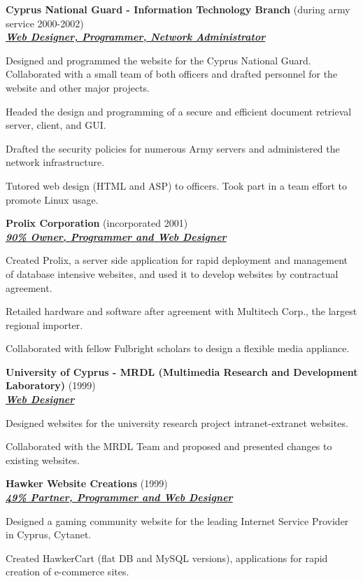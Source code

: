 \documentclass{article}
\newcommand{\employer}[3]{{ \textbf{#1} (#2)\\ \underline{\textbf{\emph{#3}}}\\  }}
\newenvironment{achievements}{\begin{list}{\topsep 0pt \itemsep -2pt}} {\vspace*{4pt}\end{list}}
\begin{document}
\employer{Cyprus National Guard - Information Technology Branch}{during army service 2000-2002} {Web Designer, Programmer, Network Administrator}
	\begin{achievements}
	\item Designed and programmed the website for the Cyprus National Guard. Collaborated with a small team of both officers and drafted personnel for the website and other major projects.
	\item Headed the design and programming of a secure and efficient document retrieval server, client, and GUI.
	\item Drafted the security policies for numerous Army servers and administered the network infrastructure.
	\item Tutored web design (HTML and ASP) to officers. Took part in a team effort to promote Linux usage.
	\end{achievements}

\employer{Prolix Corporation}{incorporated 2001}{90\% Owner, Programmer and Web Designer}
	\begin{achievements}
	\item Created Prolix, a server side application for rapid deployment and management of database intensive websites, and used it to develop websites by contractual agreement.
	\item Retailed hardware and software after agreement with Multitech Corp., the largest regional importer.
	\item Collaborated with fellow Fulbright scholars to design a flexible media appliance.
	\end{achievements}

\employer{University of Cyprus - MRDL (Multimedia Research and Development Laboratory)}{1999}
	{Web Designer}
	\begin{achievements}
	\item Designed websites for the university research project intranet-extranet websites.
	\item Collaborated with the MRDL Team and proposed and presented changes to existing websites.
	\end{achievements}

\employer{Hawker Website Creations}{1999}{49\% Partner, Programmer and Web Designer}
	\begin{achievements}
	\item Designed a gaming community website for the leading Internet Service Provider in Cyprus, Cytanet.
	\item Created HawkerCart (flat DB and MySQL versions), applications for rapid creation of e-commerce sites.
	\end{achievements}
\end{document}
